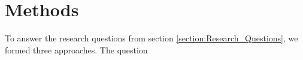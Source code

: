 \chapter{Methods}\label{chapter:Methods}

To answer the research questions from section \ref{section:Research_Questions}, we formed three approaches.
The question 




